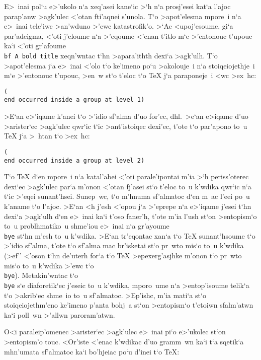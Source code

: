 E>~inai pol`u e>'ukolo  n`a xeq'asei kane`ic >`h n`a prosj'esei kat`a
l'ajoc parap'anw >agk'ulec <'otan fti'aqnei s'unola.  T`o >apot'elesma
mpore~i n`a e>~inai tele'iwc >an'wduno >'ewc katastrofik'o.  >`Ac
<upoj'esoume, gi`a par'adeigma, <'oti j'eloume n`a >'eqoume <'enan
t'itlo m`e >'entonouc t'upouc ka`i <'oti gr'afoume {\tt \lb\\bf A bold
title} xeqn'wntac t`hn >apara'ithth dexi`a >agk'ulh.  T`o >apot'elesma
j`a e>~inai <'olo t`o ke'imeno po`u >akolouje~i n`a stoiqeiojethje~i m`e
>'entonouc t'upouc, >en~w st`o t'eloc t`o {\rm \TeX} j`a paraponeje~i
<wc >ex~hc:

{\tt (\\end occurred inside a group at level 1)}

>E`an e>'iqame k'anei t`o >'idio sf'alma d'uo for'ec, dhl.\ >e`an
e>iqame d'uo >arister`ec >agk'ulec qwr`ic t`ic >ant'istoiqec dexi'ec,
t'ote t`o par'apono to~u {\rm \TeX} j`a >~htan t`o >ex~hc:

{\tt (\\end occurred inside a group at level 2)}

T`o {\rm \TeX} d`en mpore~i n`a katal'abei <'oti parale'ipontai m'ia >`h
periss'oterec dexi`ec >agk'ulec pa\-r`a m'onon <'otan fj'asei st`o
t'eloc to~u k'wdika qwr`ic n`a t`ic >'eqei sunant'hsei.  Sunep~wc, t`o
m'hnuma sf'al\-matoc d`en m~ac l'eei po~u k'aname t`o l'ajoc.  >E`an <h
j'esh <'opou j`a >'eprepe n`a e>'iqame j'esei t`hn dexi`a >agk'ulh d`en
e>~inai ka`i t'oso faner'h, t'ote m'ia l'ush st`on >entopism`o to~u
problhmatiko~u shme'iou e>~inai n`a gr'ayoume {\tt \\bye} st`hn m'esh
to~u k'wdika.  >E`an tr'eqontac xan`a t`o {\rm\TeX} sunant'hsoume t`o
>'idio sf'alma, t'ote t`o sf'alma mac br'isketai st`o pr~wto mis`o to~u
k'wdika (>ef'' <'oson t`hn de'uterh for`a t`o {\rm\TeX} >epexerg'asjhke
m'onon t`o pr~wto mis`o to~u k'wdika >'ewc t`o {\tt\\bye}). 
Metakin'wntac t`o {\tt\\bye} s`e diaforetik`ec j'eseic to~u k'wdika,
mporo~ume n`a >ento\-p'i\-sou\-me telik`a t`o >akrib`ec shme~io to~u
sf'almatoc.  >Ep'ishc, m'ia mati`a st`o stoiqeiojethm'eno ke'imeno
p'anta bohj~a st`on >entopism`o t'etoiwn sfalm'atwn ka`i poll~wn >'allwn
paroram'atwn.

O<i paraleip'omenec >arister`ec >agk'ulec e>~inai pi`o e>'ukolec st`on
>entopism'o touc.  <Or'iste <'enac k'wdikac d'uo gramm~wn ka`i t`a
sqetik`a mhn'umata sf'almatoc ka`i bo'hjeiac po`u d'inei t`o {\rm \TeX}: 


